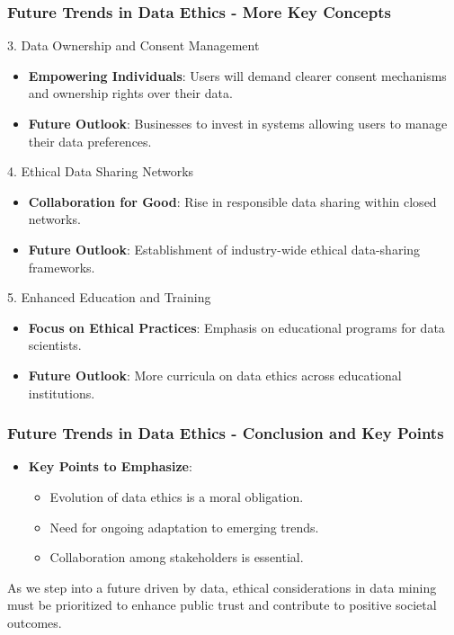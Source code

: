 \documentclass[aspectratio=169]{beamer}
\begin{document}
\begin{frame}[fragile]
    \frametitle{Future Trends in Data Ethics - More Key Concepts}
    \begin{block}{3. Data Ownership and Consent Management}
        \begin{itemize}
            \item \textbf{Empowering Individuals}: Users will demand clearer consent mechanisms and ownership rights over their data.
            \item \textbf{Future Outlook}: Businesses to invest in systems allowing users to manage their data preferences.
        \end{itemize}
    \end{block}

    \begin{block}{4. Ethical Data Sharing Networks}
        \begin{itemize}
            \item \textbf{Collaboration for Good}: Rise in responsible data sharing within closed networks.
            \item \textbf{Future Outlook}: Establishment of industry-wide ethical data-sharing frameworks.
        \end{itemize}
    \end{block}
    
    \begin{block}{5. Enhanced Education and Training}
        \begin{itemize}
            \item \textbf{Focus on Ethical Practices}: Emphasis on educational programs for data scientists.
            \item \textbf{Future Outlook}: More curricula on data ethics across educational institutions.
        \end{itemize}
    \end{block}
\end{frame}

\begin{frame}[fragile]
    \frametitle{Future Trends in Data Ethics - Conclusion and Key Points}
    \begin{itemize}
        \item \textbf{Key Points to Emphasize}:
        \begin{itemize}
            \item Evolution of data ethics is a moral obligation.
            \item Need for ongoing adaptation to emerging trends.
            \item Collaboration among stakeholders is essential.
        \end{itemize}
    \end{itemize}
    
    As we step into a future driven by data, ethical considerations in data mining must be prioritized to enhance public trust and contribute to positive societal outcomes.
\end{frame}
\end{document}
